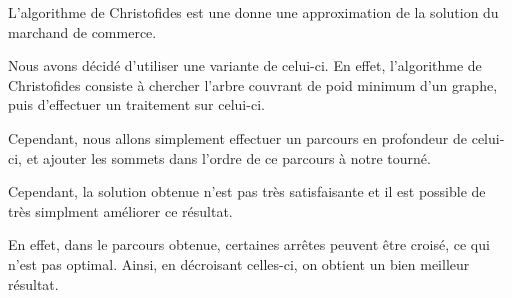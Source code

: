 \documentclass{report}
\begin{document}
  L'algorithme de Christofides est une donne une approximation de la solution du marchand de commerce.

  Nous avons décidé d'utiliser une variante de celui-ci. En effet, l'algorithme de Christofides consiste à chercher l'arbre couvrant de poid minimum d'un graphe, puis d'effectuer un traitement sur celui-ci.


  Cependant, nous allons simplement effectuer un parcours en profondeur de celui-ci, et ajouter les sommets dans l'ordre de ce parcours à notre tourné.


  Cependant, la solution obtenue n'est pas très satisfaisante et il est possible de très simplment améliorer ce résultat.


  En effet, dans le parcours obtenue, certaines arrêtes peuvent être croisé, ce qui n'est pas optimal. Ainsi, en décroisant celles-ci, on obtient un bien meilleur résultat.
\end{document}
